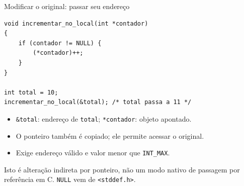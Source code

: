 \begin{frame}[fragile]{Modificar o original: passar seu endereço}
\begin{lstlisting}
void incrementar_no_local(int *contador)
{
    if (contador != NULL) {
        (*contador)++;
    }
}

int total = 10;
incrementar_no_local(&total); /* total passa a 11 */
\end{lstlisting}
\begin{itemize}
\item \texttt{\&total}: endereço de \texttt{total}; \texttt{*contador}: objeto apontado.
\item O ponteiro também é copiado; ele permite acessar o original.
\item Exige endereço válido e valor menor que \texttt{INT\_MAX}.
\end{itemize}
\small Isto é alteração indireta por ponteiro, não um modo nativo de passagem por referência em C. \texttt{NULL} vem de \texttt{<stddef.h>}.
\end{frame}
